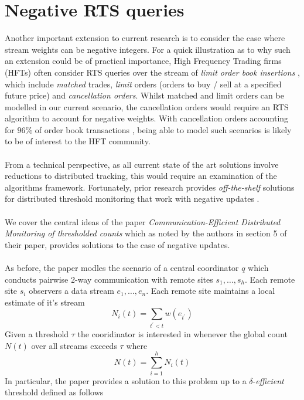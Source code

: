 \documentclass{article}
\begin{document}
\hspace{95mm}

\section*{Negative RTS queries}


Another important extension to current research is to consider the case where stream weights can be negative integers. For a quick illustration as to why such an extension could be of practical importance, High Frequency Trading firms (HFTs) often consider RTS queries over the stream of \textit{limit order book insertions} \cite{HFTData}, which include \textit{matched} trades, \textit{limit} orders (orders to buy / sell at a specified future price) and \textit{cancellation orders}. Whilst matched and limit orders can be modelled in our current scenario, the cancellation orders would require an RTS algorithm to account for negative weights. With cancellation orders accounting for 96\% of order book transactions \citep{HFTData}, being able to model such scenarios is likely to be of interest to the HFT community. \\
\\
From a technical perspective, as all current state of the art solutions involve reductions to distributed tracking, this would require an examination of the algorithms framework. Fortunately, prior research provides \textit{off-the-shelf} solutions for distributed threshold monitoring that work with negative updates \cite{10.1145/1142473.1142507}. \\
\\
We cover the central ideas of the paper \textit{Communication-Efficient Distributed Monitoring of thresholded counts} \cite{10.1145/1142473.1142507} which as noted by the authors in section 5 of their paper, provides solutions to the case of negative updates. \\
\\
As before, the paper modles the scenario of a central coordinator $q$ which conducts pairwise 2-way communication with remote sites $s_1, \dots, s_h$. Each remote site $s_i$ observers a data stream $e_1, \dots, e_n$. Each remote site maintains a local estimate of it's stream
$$N_i(t) = \sum_{t^\prime < t} w(e_{t^\prime})$$
Given a threshold $\tau$ the cooridinator is interested in whenever the global count $N(t)$ over all streams exceeds $\tau$ where
$$N(t) = \sum_{i=1}^{h} N_i(t)$$
In particular, the paper provides a solution to this problem up to a $\delta$-\textit{efficient} threshold defined as follows 
\end{document}
